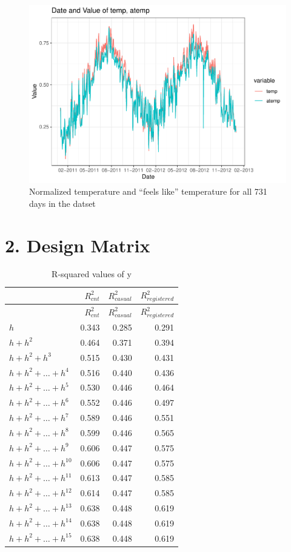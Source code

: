 \documentclass[
]{article}
\begin{document}
\begin{figure}
\centering
\includegraphics{LeastSquares_files/figure-latex/unnamed-chunk-4-1.pdf}
\caption{Normalized temperature and ``feels like'' temperature for all
731 days in the datset}
\end{figure}

\newpage

\hypertarget{design-matrix}{%
\section{2. Design Matrix}\label{design-matrix}}

\begin{longtable}[]{@{}lrrr@{}}
\caption{R-squared values of y}\tabularnewline
\toprule
& \(R^{2}_{cnt}\) & \(R^{2}_{casual}\) &
\(R^{2}_{registered}\)\tabularnewline
\midrule
\endfirsthead
\toprule
& \(R^{2}_{cnt}\) & \(R^{2}_{casual}\) &
\(R^{2}_{registered}\)\tabularnewline
\midrule
\endhead
\(h\) & 0.343 & 0.285 & 0.291\tabularnewline
\(h+h^{2}\) & 0.464 & 0.371 & 0.394\tabularnewline
\(h+h^{2}+h^{3}\) & 0.515 & 0.430 & 0.431\tabularnewline
\(h+h^{2}+\dots+h^{4}\) & 0.516 & 0.440 & 0.436\tabularnewline
\(h+h^{2}+\dots+h^{5}\) & 0.530 & 0.446 & 0.464\tabularnewline
\(h+h^{2}+\dots+h^{6}\) & 0.552 & 0.446 & 0.497\tabularnewline
\(h+h^{2}+\dots+h^{7}\) & 0.589 & 0.446 & 0.551\tabularnewline
\(h+h^{2}+\dots+h^{8}\) & 0.599 & 0.446 & 0.565\tabularnewline
\(h+h^{2}+\dots+h^{9}\) & 0.606 & 0.447 & 0.575\tabularnewline
\(h+h^{2}+\dots+h^{10}\) & 0.606 & 0.447 & 0.575\tabularnewline
\(h+h^{2}+\dots+h^{11}\) & 0.613 & 0.447 & 0.585\tabularnewline
\(h+h^{2}+\dots+h^{12}\) & 0.614 & 0.447 & 0.585\tabularnewline
\(h+h^{2}+\dots+h^{13}\) & 0.638 & 0.448 & 0.619\tabularnewline
\(h+h^{2}+\dots+h^{14}\) & 0.638 & 0.448 & 0.619\tabularnewline
\(h+h^{2}+\dots+h^{15}\) & 0.638 & 0.448 & 0.619\tabularnewline
\bottomrule
\end{longtable}
\end{document}
